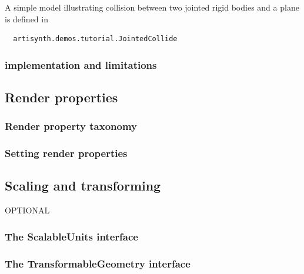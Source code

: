 A simple model illustrating collision between two jointed rigid bodies
and a plane is defined in
%
\begin{verbatim}
  artisynth.demos.tutorial.JointedCollide
\end{verbatim}
%


\subsubsection{implementation and limitations}








\subsection{Render properties}
\label{RenderProperties:sec}

\subsubsection{Render property taxonomy}

\subsubsection{Setting render properties}

\subsection{Scaling and transforming}

OPTIONAL

\subsubsection{The ScalableUnits interface}

\subsubsection{The TransformableGeometry interface}
